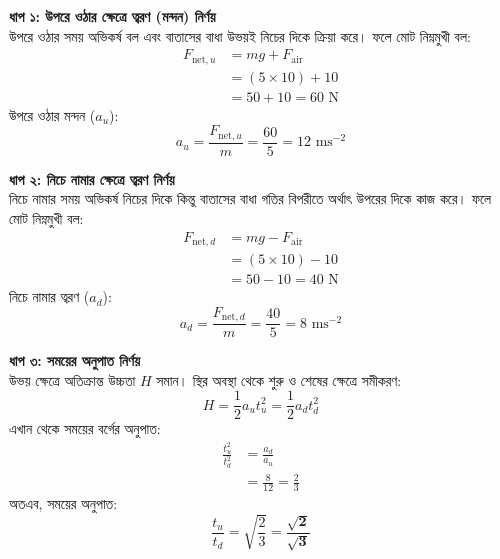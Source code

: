 \documentclass[12pt, a4paper]{article}
\begin{document}
\begin{tcolorbox}[solutionbox={সমাধান (Solution)}]
    \noindent
    \textbf{ধাপ ১: উপরে ওঠার ক্ষেত্রে ত্বরণ (মন্দন) নির্ণয়} \\
    উপরে ওঠার সময় অভিকর্ষ বল এবং বাতাসের বাধা উভয়ই নিচের দিকে ক্রিয়া করে। ফলে মোট নিম্নমুখী বল:
    \begin{align*}
        F_{\text{net}, u} &= mg + F_{\text{air}} \\
        &= (5 \times 10) + 10 \\
        &= 50 + 10 = 60\text{ N}
    \end{align*}
    উপরে ওঠার মন্দন ($a_u$):
    \[ a_u = \frac{F_{\text{net}, u}}{m} = \frac{60}{5} = 12\text{ ms}^{-2} \]
    
    \vspace{0.5em}
    \noindent\textbf{ধাপ ২: নিচে নামার ক্ষেত্রে ত্বরণ নির্ণয়} \\
    নিচে নামার সময় অভিকর্ষ নিচের দিকে কিন্তু বাতাসের বাধা গতির বিপরীতে অর্থাৎ উপরের দিকে কাজ করে। ফলে মোট নিম্নমুখী বল:
    \begin{align*}
        F_{\text{net}, d} &= mg - F_{\text{air}} \\
        &= (5 \times 10) - 10 \\
        &= 50 - 10 = 40\text{ N}
    \end{align*}
    নিচে নামার ত্বরণ ($a_d$):
    \[ a_d = \frac{F_{\text{net}, d}}{m} = \frac{40}{5} = 8\text{ ms}^{-2} \]
    
    \vspace{0.5em}
    \noindent\textbf{ধাপ ৩: সময়ের অনুপাত নির্ণয়} \\
    উভয় ক্ষেত্রে অতিক্রান্ত উচ্চতা $H$ সমান। স্থির অবস্থা থেকে শুরু ও শেষের ক্ষেত্রে সমীকরণ:
    \[ H = \frac{1}{2} a_u t_u^2 = \frac{1}{2} a_d t_d^2 \]
    এখান থেকে সময়ের বর্গের অনুপাত:
    \begin{align*}
        \frac{t_u^2}{t_d^2} &= \frac{a_d}{a_u} \\
        &= \frac{8}{12} = \frac{2}{3}
    \end{align*}
    অতএব, সময়ের অনুপাত:
    \[ \frac{t_u}{t_d} = \sqrt{\frac{2}{3}} = \mathbf{\frac{\sqrt{2}}{\sqrt{3}}} \]
\end{tcolorbox}

\newpage
\end{document}
